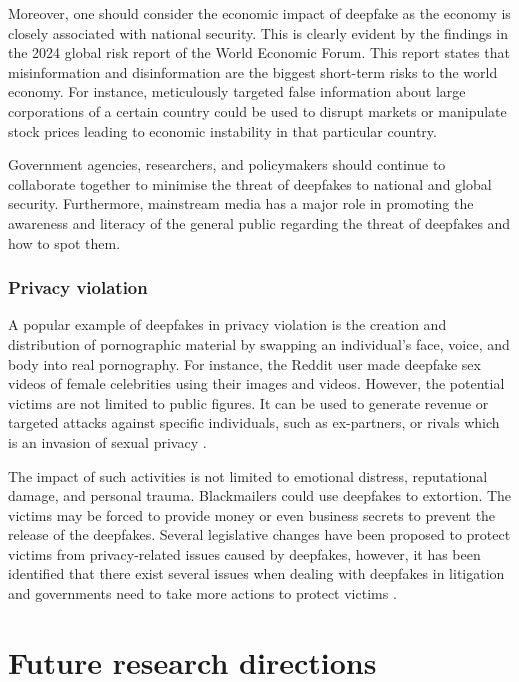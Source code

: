 Moreover, one should consider the economic impact of deepfake as the economy is closely associated with national security. This is clearly evident by the findings in the 2024 global risk report of the  World Economic Forum. This report states that misinformation and disinformation are the biggest short-term risks to the world economy. For instance, meticulously targeted false information about large corporations of a certain country could be used to disrupt markets or manipulate stock prices leading to economic instability in that particular country. 

Government agencies, researchers, and policymakers should continue to collaborate together to minimise the threat of deepfakes to national and global security. Furthermore, mainstream media has a major role in promoting the awareness and literacy of the general public regarding the threat of deepfakes and how to spot them.

\subsubsection{ Privacy violation} 
A popular example of deepfakes in privacy violation is the creation and distribution of pornographic material by swapping an individual's face, voice, and body into real pornography. For instance, the Reddit user made deepfake sex videos of female celebrities using their images and videos. However, the potential victims are not limited to public figures. It can be used to generate revenue or targeted attacks against specific individuals, such as ex-partners, or rivals which is an invasion of sexual privacy \cite{citron2018sexual}.

The impact of such activities is not limited to emotional distress, reputational damage, and personal trauma. Blackmailers could use deepfakes to extortion. The victims may be forced to provide money or even business secrets to prevent the release of the deepfakes. Several legislative changes have been proposed to protect victims from privacy-related issues caused by deepfakes, however, it has been identified that there exist several issues when dealing with deepfakes in litigation and governments need to take more actions to protect victims \cite{deepprivacy}.


\hspace{3mm}
\section{Future research directions} \label{sec:future_research}
 
